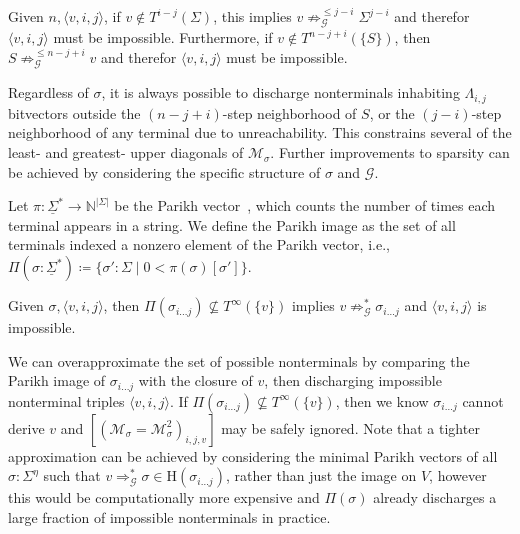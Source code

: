 \documentclass[sigplan,review,anonymous,acmsmall]{acmart}\settopmatter{printfolios=false,printccs=false,printacmref=false}
\begin{document}
\begin{lemma}
  Given $n, \langle v, i, j \rangle$, if $v \notin T^{i-j}(\Sigma)$, this implies $v\not\Rightarrow^{\leq j-i}_\mathcal{G} \Sigma^{j-i}$ and therefor $\langle v, i, j \rangle$ must be impossible. Furthermore, if $v \notin T^{n-j+i}(\{S\})$, then $S\not\Rightarrow^{\leq n-j+i}_\mathcal{G} v$ and therefor $\langle v, i, j \rangle$ must be impossible.
\end{lemma}

Regardless of $\sigma$, it is always possible to discharge nonterminals inhabiting $\Lambda_{i, j}$ bitvectors outside the $(n-j+i)$-step neighborhood of $S$, or the $(j-i)$-step neighborhood of any terminal due to unreachability. This constrains several of the least- and greatest- upper diagonals of $\mathcal{M}_\sigma$. Further improvements to sparsity can be achieved by considering the specific structure of $\sigma$ and $\mathcal{G}$.

\begin{definition}
  Let $\pi: \underline\Sigma^*\rightarrow\mathbb{N}^{|\Sigma|}$ be the Parikh vector~\cite{parikh1966context}, which counts the number of times each terminal appears in a string. We define the Parikh image as the set of all terminals indexed a nonzero element of the Parikh vector, i.e., $\Pi(\sigma:\underline\Sigma^*) \coloneq \{\sigma': \Sigma \mid 0 < \pi(\sigma)[\sigma']\}$. %
\end{definition}

\begin{lemma}
Given $\sigma, \langle v, i, j \rangle$, then $\Pi(\sigma_{i\ldots j}) \not\subseteq T^\infty(\{v\})$ implies $v\not\Rightarrow^*_\mathcal{G} \sigma_{i\ldots j}$ and $\langle v, i, j \rangle$ is impossible.
\end{lemma}

We can overapproximate the set of possible nonterminals by comparing the Parikh image of $\sigma_{i\ldots j}$ with the closure of $v$, then discharging impossible nonterminal triples $\langle v, i, j \rangle$. If $\Pi(\sigma_{i\ldots j}) \not\subseteq T^\infty(\{v\})$, then we know $\sigma_{i\ldots j}$ cannot derive $v$ and $\left[(\mathcal{M}_{\sigma} = \mathcal{M}_{\sigma}^2)_{i, j, v}\right]$ may be safely ignored. Note that a tighter approximation can be achieved by considering the minimal Parikh vectors of all $\sigma: \Sigma^\eta$ such that $v \Rightarrow_\mathcal{G}^* \sigma \in \text{H}(\sigma_{i\ldots j})$, rather than just the image on $V$, however this would be computationally more expensive and $\Pi(\sigma)$ already discharges a large fraction of impossible nonterminals in practice.
\end{document}

